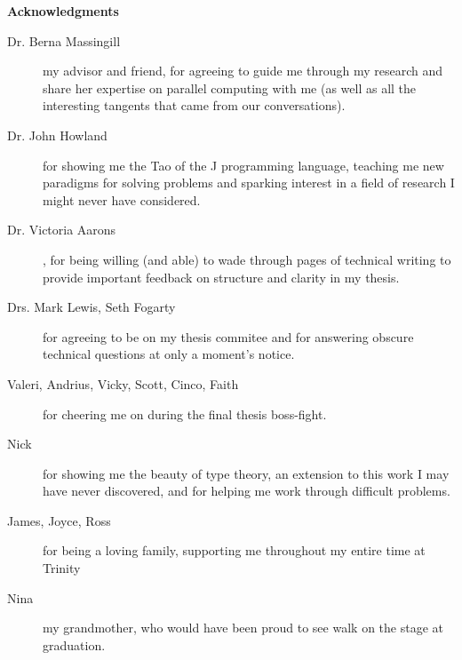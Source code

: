 \begin{center}

\bigskip

\begin{Large}
\textbf{Acknowledgments}
\end{Large}

\bigskip

\end{center}

\begin{description}
	\item[Dr. Berna Massingill] my advisor and friend, for agreeing to guide me through my research and 
		share her expertise on parallel computing with me (as well as all the interesting tangents that came from our conversations).
	\item[Dr. John Howland] for showing me the Tao of the J programming language, 
		teaching me new paradigms for solving problems and 
		sparking interest in a field of research I might never have considered.
	\item[Dr. Victoria Aarons], for being willing (and able) to wade through pages of technical writing 
		to provide important feedback on structure and clarity in my thesis. 
	\item[Drs. Mark Lewis, Seth Fogarty] for agreeing to be on my thesis commitee and 
		for answering obscure technical questions at only a moment's notice.
	\item[Valeri, Andrius, Vicky, Scott, Cinco, Faith] for cheering me on during the final thesis boss-fight.
	\item[Nick] for showing me the beauty of type theory, an extension to this work I may have never discovered, 
		and for helping me work through difficult problems.
	\item[James, Joyce, Ross] for being a loving family, supporting me throughout my entire time at Trinity
	\item[Nina] my grandmother, who would have been proud to see walk on the stage at graduation.
\end{description}
